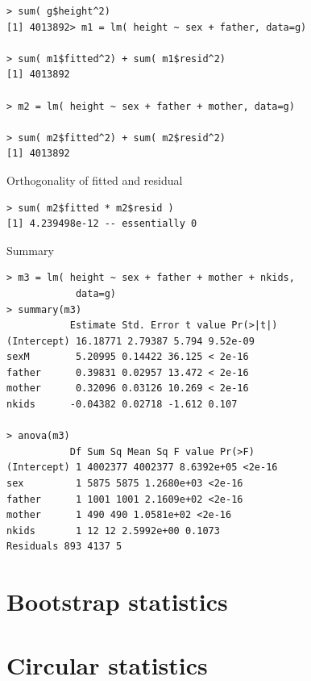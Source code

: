 \begin{lstlisting}
> sum( g$height^2)
[1] 4013892> m1 = lm( height ~ sex + father, data=g)

> sum( m1$fitted^2) + sum( m1$resid^2)
[1] 4013892

> m2 = lm( height ~ sex + father + mother, data=g)

> sum( m2$fitted^2) + sum( m2$resid^2)
[1] 4013892
\end{lstlisting}

Orthogonality of fitted and residual
\begin{lstlisting}
> sum( m2$fitted * m2$resid )
[1] 4.239498e-12 -- essentially 0
\end{lstlisting}

Summary
\begin{lstlisting}
> m3 = lm( height ~ sex + father + mother + nkids, 
            data=g)
> summary(m3)
           Estimate Std. Error t value Pr(>|t|)
(Intercept) 16.18771 2.79387 5.794 9.52e-09
sexM        5.20995 0.14422 36.125 < 2e-16
father      0.39831 0.02957 13.472 < 2e-16
mother      0.32096 0.03126 10.269 < 2e-16
nkids      -0.04382 0.02718 -1.612 0.107

> anova(m3)
           Df Sum Sq Mean Sq F value Pr(>F)
(Intercept) 1 4002377 4002377 8.6392e+05 <2e-16
sex         1 5875 5875 1.2680e+03 <2e-16
father      1 1001 1001 2.1609e+02 <2e-16
mother      1 490 490 1.0581e+02 <2e-16
nkids       1 12 12 2.5992e+00 0.1073
Residuals 893 4137 5
\end{lstlisting}


\section{Bootstrap statistics}



\section{Circular statistics}

